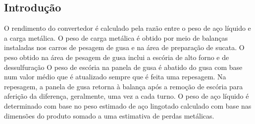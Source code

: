 \begin{multicols}{2}

	




\pagestyle{plain}
\setcounter{page}{1}
\section{Introdução}
	O rendimento do convertedor é calculado pela razão entre o peso de aço líquido e a carga metálica. O peso de carga metálica é obtido por meio de balanças instaladas nos carros de pesagem de gusa e na área de preparação de sucata. O peso obtido na área de pesagem de gusa inclui a escória de alto forno e de dessulfuração O peso de escória na panela de gusa é abatido do gusa com base num valor médio que é atualizado sempre que é feita uma repesagem. Na repesagem, a panela de gusa retorna à balança após a remoção de escória para aferição da diferença, geralmente, uma vez a cada turno. O peso de aço líquido é determinado com base no peso estimado de aço lingotado calculado com base nas dimensões do produto somado a uma estimativa de perdas metálicas.
	

\end{multicols}
